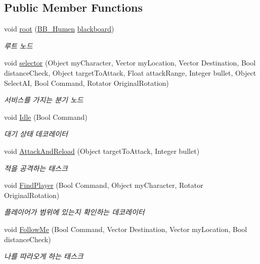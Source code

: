 \subsection*{Public Member Functions}
\begin{DoxyCompactItemize}
\item 
void \hyperlink{class_b_t___base_a54881cf55e411fdbf6c9f98586049742}{root} (\hyperlink{class_b_b___humen}{B\+B\+\_\+\+Humen} \hyperlink{class_b_t___base_ad6873a8492447b0b9d0eef5b28032a9d}{blackboard})
\begin{DoxyCompactList}\small\item\em 루트 노드 \end{DoxyCompactList}\item 
void \hyperlink{class_b_t___base_adbbf3731340b4e525a1ea549fd6409f3}{selector} (Object my\+Character, Vector my\+Location, Vector Destination, Bool distance\+Check, Object target\+To\+Attack, Float attack\+Range, Integer bullet, Object Select\+AI, Bool Command, Rotator Original\+Rotation)
\begin{DoxyCompactList}\small\item\em 서비스를 가지는 분기 노드 \end{DoxyCompactList}\item 
void \hyperlink{class_b_t___base_a68cb1b35bc3105c36e0bd4b8477a1ec9}{Idle} (Bool Command)
\begin{DoxyCompactList}\small\item\em 대기 상태 데코레이터 \end{DoxyCompactList}\item 
void \hyperlink{class_b_t___base_a4473d81f72741d7b1b4956feada36a28}{Attack\+And\+Reload} (Object target\+To\+Attack, Integer bullet)
\begin{DoxyCompactList}\small\item\em 적을 공격하는 태스크 \end{DoxyCompactList}\item 
void \hyperlink{class_b_t___base_a185c89f6b41c5946e6dac9489f251c0f}{Find\+Player} (Bool Command, Object my\+Character, Rotator Original\+Rotation)
\begin{DoxyCompactList}\small\item\em 플레이어가 범위에 있는지 확인하는 데코레이터 \end{DoxyCompactList}\item 
void \hyperlink{class_b_t___base_a802b9e457808b511a6bc5ea63abd3b87}{Follow\+Me} (Bool Command, Vector Destination, Vector my\+Location, Bool distance\+Check)
\begin{DoxyCompactList}\small\item\em 나를 따라오게 하는 태스크 \end{DoxyCompactList}\item 

\end{DoxyCompactItemize}

